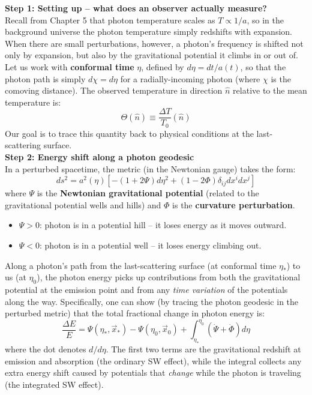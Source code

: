 \bigskip \noindent
\begin{foundation}
    \textbf{Step 1: Setting up -- what does an observer actually measure?} \\
    Recall from Chapter 5 that photon temperature scales as $T \propto 1/a$, so in the background universe the photon temperature simply redshifts with expansion. When there are small perturbations, however, a photon's frequency is shifted not only by expansion, but also by the gravitational potential it climbs in or out of. \\

    Let us work with \textbf{conformal time} $\eta$, defined by $d\eta = dt/a(t)$, so that the photon path is simply $d\chi = d\eta$ for a radially-incoming photon (where $\chi$ is the comoving distance). The observed temperature in direction $\hat{n}$ relative to the mean temperature is:
    \[
        \Theta(\hat{n}) \equiv \frac{\Delta T}{T_0}(\hat{n})
    \]
    Our goal is to trace this quantity back to physical conditions at the last-scattering surface. \\

    \pagebreak
    \textbf{Step 2: Energy shift along a photon geodesic} \\
    In a perturbed spacetime, the metric (in the Newtonian gauge) takes the form:
    \[
        ds^2 = a^2(\eta)\left[-(1+2\Psi)d\eta^2 + (1-2\Phi)\delta_{ij}dx^i dx^j\right]
    \]
    where $\Psi$ is the \textbf{Newtonian gravitational potential} (related to the gravitational potential wells and hills) and $\Phi$ is the \textbf{curvature perturbation}.
    \begin{itemize}
        \item $\Psi > 0$: photon is in a potential hill -- it loses energy as it moves outward.
        \item $\Psi < 0$: photon is in a potential well -- it loses energy climbing out.
    \end{itemize}

    Along a photon's path from the last-scattering surface (at conformal time $\eta_*$) to us (at $\eta_0$), the photon energy picks up contributions from both the gravitational potential at the emission point and from any \emph{time variation} of the potentials along the way. Specifically, one can show (by tracing the photon geodesic in the perturbed metric) that the total fractional change in photon energy is:
    \[
        \frac{\Delta E}{E} = \Psi(\eta_*, \vec{x}_*) - \Psi(\eta_0, \vec{x}_0) + \int_{\eta_*}^{\eta_0}\left(\dot{\Psi}+\dot{\Phi}\right)d\eta
    \]
    where the dot denotes $d/d\eta$. The first two terms are the gravitational redshift at emission and absorption (the ordinary SW effect), while the integral collects any extra energy shift caused by potentials that \emph{change} while the photon is traveling (the integrated SW effect). \\


\end{foundation}
